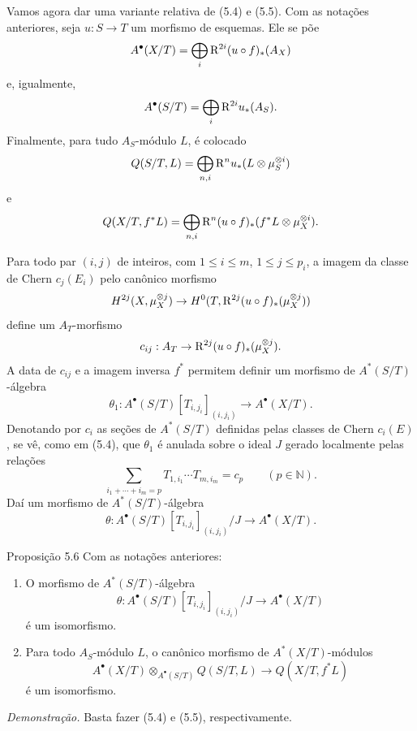 Vamos agora dar uma variante relativa de (5.4) e (5.5). Com as notações anteriores, seja $u:S\to T$ um morfismo de esquemas. Ele se põe
\[
A^\bullet(X/T)=\bigoplus_i \mathrm{R}^{2i}(u\circ f)_*(A_X)
\]
e, igualmente,
\[
A^\bullet(S/T)=\bigoplus_i \mathrm{R}^{2i}u_*(A_S).
\]
Finalmente, para tudo $A_S$-módulo $L$, é colocado
\[
Q(S/T,L)=\bigoplus_{n,i}\mathrm{R}^n u_*(L\otimes\mu_S^{\otimes i})
\]
e
\[
Q(X/T,f^*L)=\bigoplus_{n,i}\mathrm{R}^n(u\circ f)_*(f^*L\otimes\mu_X^{\otimes i}).
\]

Para todo par $(i,j)$ de inteiros, com $1\le i\le m$, $1\le j\le p_i$, a imagem da classe de Chern $c_j(E_i)$ pelo canônico morfismo
\[
H^{2j}(X,\mu_X^{\otimes j})
\to H^0(T,\mathrm{R}^{2j}(u\circ f)_*(\mu_X^{\otimes j}))
\]
define um $A_T$-morfismo
\[
c_{ij}:A_T\to \mathrm{R}^{2j}(u\circ f)_*(\mu_X^{\otimes j}).
\]
A data de $c_{ij}$ e a imagem inversa $f^*$ permitem definir um morfismo de $A^*(S/T)$-álgebra
\[
\theta_1:A^\bullet(S/T)[T_{i,j_i}]_{(i,j_i)}\to A^\bullet(X/T).
\]
Denotando por $c_i$ as seções de $A^*(S/T)$ definidas pelas classes de Chern $c_i(E)$, se vê, como em (5.4), que $\theta_1$ é anulada sobre o ideal $J$ gerado localmente pelas relações
\[
\sum_{i_1+\cdots+i_m=p}T_{1,i_1}\cdots T_{m,i_m}=c_p\qquad(p\in\mathbb N).
\]
Daí um morfismo de $A^*(S/T)$-álgebra
\[
\theta:A^\bullet(S/T)[T_{i,j_i}]_{(i,j_i)}/J\to A^\bullet(X/T).
\]

\begin{statement}{Proposição 5.6}
Com as notações anteriores:
\begin{enumerate}[label=\alph*)]
\item O morfismo de $A^*(S/T)$-álgebra
\[
\theta:A^\bullet(S/T)[T_{i,j_i}]_{(i,j_i)}/J\to A^\bullet(X/T)
\]
é um isomorfismo.
\item Para todo $A_S$-módulo $L$, o canônico morfismo de $A^*(X/T)$-módulos
\[
A^\bullet(X/T)\otimes_{A^\bullet(S/T)}Q(S/T,L)\to Q(X/T,f^*L)
\]
é um isomorfismo.
\end{enumerate}
\end{statement}

\emph{Demonstração.} Basta fazer (5.4) e (5.5), respectivamente.
